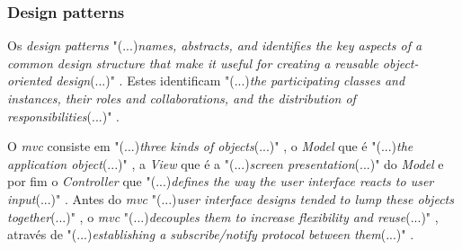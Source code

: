  \subsubsection{Design patterns}
Os \textit{design patterns} "(...)\emph{names, abstracts, and identifies the key aspects of a common design structure that make it useful for creating a reusable object-oriented design}(...)" \citep{design_patterns}. Estes identificam "(...)\emph{the participating classes and instances, their roles and collaborations, and the distribution of responsibilities}(...)" \citep{design_patterns}.

O \textit{\acrfull{mvc}} consiste em "(...)\emph{three kinds of objects}(...)" \citep{design_patterns}, o \textit{Model} que é "(...)\emph{the application object}(...)" \citep{design_patterns}, a \textit{View} que é a "(...)\emph{screen presentation}(...)" \citep{design_patterns} do \textit{Model} e por fim o \textit{Controller} que "(...)\emph{defines the way the user interface reacts to user input}(...)" \citep{design_patterns}. Antes do \textit{\acrshort{mvc}} "(...)\emph{user interface designs tended to lump these objects together}(...)" \citep{design_patterns}, o \textit{\acrshort{mvc}} "(...)\emph{decouples them to increase flexibility and reuse}(...)" \citep{design_patterns}, através de "(...)\emph{establishing a subscribe/notify protocol between them}(...)" \citep{design_patterns}.